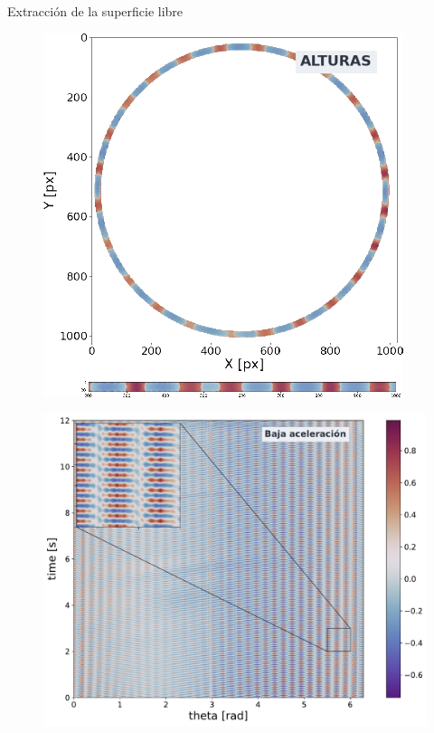 \documentclass[aspectratio=169]{beamer}
\begin{document}
\begin{frame}{Extracción de la superficie libre} %
	\begin{minipage}{0.49\textwidth}
	  \begin{figure}
	    \includegraphics[width=0.8\linewidth]{figs/anillo_a_strip.png}
	  \end{figure}
	\end{minipage} \hfill
	\begin{minipage}{0.49\textwidth}
	  \begin{figure}
	    \includegraphics[width=\linewidth]{figs/st_MED5.pdf}
	  \end{figure}
	\end{minipage}
\end{frame}
\end{document}

